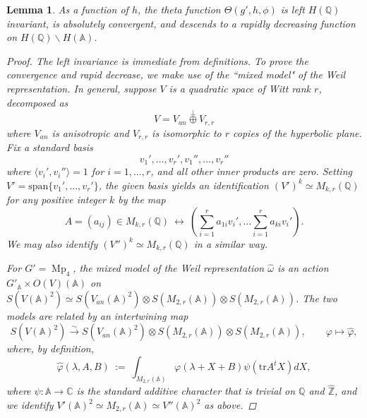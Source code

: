 \documentclass[reqno,oneside]{amsart}
\theoremstyle{plain}
\newtheorem{lemma}[theorem]{Lemma}
\theoremstyle{remark}
\numberwithin{theorem}{section}
\newcommand{\bbA}{\mathbb A}
\newcommand{\bbC}{\mathbb C}
\newcommand{\bbQ}{\mathbb Q}
\newcommand{\bbZ}{\mathbb Z}
\DeclareMathOperator{\Mp}{Mp}
\begin{document}
	
	\begin{lemma}
		As a function of $h$, the theta function $\Theta(g', h, \phi)$ is left $H(\bbQ) $ invariant, is absolutely convergent, and descends to a rapidly decreasing function on $H(\bbQ) \backslash H(\bbA)$.
		\begin{proof}
			The left invariance is immediate from definitions. To prove the convergence and rapid decrease, we make use of the ``mixed model" of the Weil representation. In general, suppose $V$ is a quadratic space of Witt rank $r$, decomposed as
			\begin{equation}
			V = V_{an} \stackrel{\perp}{\oplus} V_{r,r}
			\end{equation}
			where $V_{an}$ is anisotropic and $V_{r,r}$ is isomorphic to $r$ copies of the hyperbolic plane. Fix a standard basis
			\begin{equation}
			v_1', \dots, v_r', v_1'', \dots, v_r''
			\end{equation}
			where $\langle v_i', v_i'' \rangle = 1$ for $i = 1, \dots, r$, and all other inner products are zero. Setting $V' = \mathrm{span} \{  v_1', \dots, v_r'\}$,  the given basis yields an identification $(V')^k \simeq M_{k, r}(\bbQ)$ for any positive integer $k$ by the map
			\begin{equation}
			A = (a_{ij}) \in M_{k,r}(\bbQ)  \ \longleftrightarrow \  \left(   \sum_{i=1}^r a_{1i} v_i', \dots \sum_{i = 1}^r a_{ki} v_i'  \right).
			\end{equation}
			We may also identify $(V'')^k \simeq M_{k,r}(\bbQ)$ in a similar way.
			
			For $G' = \Mp_4$, the mixed model  of the Weil representation $\widehat \omega$ is an action  $G'_{\bbA} \times O(V)(\bbA)$ on $S(V(\bbA)^2) \simeq S(V_{an}(\bbA)^{2})  \otimes S( M_{2,r}(\bbA)) \otimes S(M_{2,r}(\bbA)) $. The two models are related by an intertwining map
			\begin{equation}	
			S(V(\bbA)^2) \stackrel{\sim}{\longrightarrow}  S(V_{an}(\bbA)^{2})  \otimes S( M_{2,r}(\bbA)) \otimes S(M_{2,r}(\bbA)), \qquad \varphi \mapsto \widehat \varphi,
			\end{equation}
			where, by definition,
			\begin{equation}
			\widehat \varphi(\lambda, A, B) \ := \ \int_{M_{2,r}(\bbA) }  \varphi(\lambda + X + B) \psi(\mathrm{tr}A^t X) dX,
			\end{equation}
			where $\psi \colon \bbA \to \bbC$ is the standard additive character that is trivial on $\bbQ$ and $\widehat{\bbZ}$, and we identify $V'(\bbA)^2 \simeq M_{2,r}(\bbA) \simeq V''(\bbA)^2$ as above.
			

\end{proof}
\end{lemma}
\end{document}
